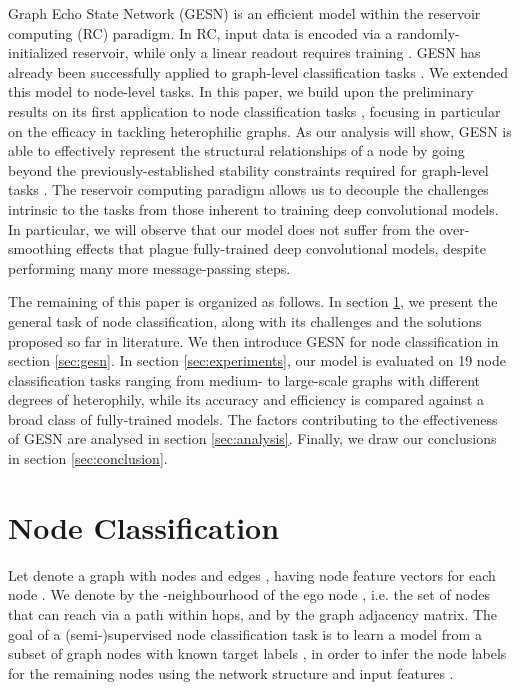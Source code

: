 \documentclass[final,5p,times,twocolumn]{elsarticle}
\begin{document}
Graph Echo State Network (GESN) \cite{Gallicchio2010} is an efficient model within the reservoir computing (RC) paradigm.
In RC, input data is encoded via a randomly-initialized reservoir, while only a linear readout requires training \cite{Nakajima2021}.
GESN has already been successfully applied to graph-level classification tasks \cite{Gallicchio2020}.
We extended this model to node-level tasks.
In this paper, we build upon the preliminary results on its first application to node classification tasks \cite{Tortorella2022esann}, focusing in particular on the efficacy in tackling heterophilic graphs.
As our analysis will show, GESN is able to effectively represent the structural relationships of a node by going beyond the previously-established stability constraints required for graph-level tasks \cite{Tortorella2022}.
The reservoir computing paradigm allows us to decouple the challenges intrinsic to the tasks from those inherent to training deep convolutional models.
In particular, we will observe that our model does not suffer from the over-smoothing effects that plague fully-trained deep convolutional models, despite performing many more message-passing steps.

The remaining of this paper is organized as follows.
In section \ref{sec:background}, we present the general task of node classification, along with its challenges and the solutions proposed so far in literature.
We then introduce GESN for node classification in section \ref{sec:gesn}.
In section \ref{sec:experiments}, our model is evaluated on 19 node classification tasks ranging from medium- to large-scale graphs with different degrees of heterophily, while its accuracy and efficiency is compared against a broad class of fully-trained models.
The factors contributing to the effectiveness of GESN are analysed in section \ref{sec:analysis}.
Finally, we draw our conclusions in section \ref{sec:conclusion}.

\section{Node Classification}
\label{sec:background}

Let  denote a graph with nodes  and edges , having node feature vectors  for each node .
We denote by  the -neighbourhood of the ego node , i.e. the set of nodes that can reach  via a path within  hops, and by  the graph adjacency matrix.
The goal of a (semi-)supervised node classification task is to learn a model from a subset  of graph nodes with known target labels , in order to infer the node labels  for the remaining nodes  using the network structure and input features .
\end{document}
